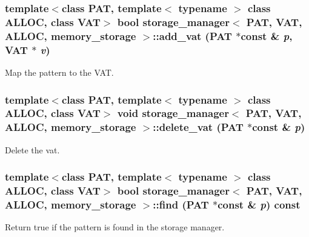\subsubsection{\setlength{\rightskip}{0pt plus 5cm}template$<$class PAT, template$<$ typename $>$ class ALLOC, class VAT$>$ bool \bf{storage\_\-manager}$<$ PAT, VAT, ALLOC, \bf{memory\_\-storage} $>$::add\_\-vat (PAT $\ast$const \& {\em p}, VAT $\ast$ {\em v})\hspace{0.3cm}{\tt  [inline]}}\label{classstorage__manager_3_01PAT_00_01VAT_00_01ALLOC_00_01memory__storage_01_4_e7256dba2f08982b8433613fd53e3bc3}


Map the pattern to the VAT. 
\subsubsection{\setlength{\rightskip}{0pt plus 5cm}template$<$class PAT, template$<$ typename $>$ class ALLOC, class VAT$>$ void \bf{storage\_\-manager}$<$ PAT, VAT, ALLOC, \bf{memory\_\-storage} $>$::delete\_\-vat (PAT $\ast$const \& {\em p})\hspace{0.3cm}{\tt  [inline]}}\label{classstorage__manager_3_01PAT_00_01VAT_00_01ALLOC_00_01memory__storage_01_4_b60523c6fb8da71fa54c46c2d695392d}


Delete the vat. 
\subsubsection{\setlength{\rightskip}{0pt plus 5cm}template$<$class PAT, template$<$ typename $>$ class ALLOC, class VAT$>$ bool \bf{storage\_\-manager}$<$ PAT, VAT, ALLOC, \bf{memory\_\-storage} $>$::find (PAT $\ast$const \& {\em p}) const\hspace{0.3cm}{\tt  [inline]}}\label{classstorage__manager_3_01PAT_00_01VAT_00_01ALLOC_00_01memory__storage_01_4_0f310c70843da125fd825b3cddfebcb9}


Return true if the pattern is found in the storage manager. 

